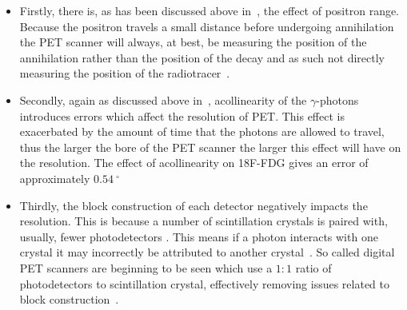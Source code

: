                 \begin{itemize}
                    \item Firstly, there is, as has been discussed above in~, the effect of positron range. Because the positron travels a small distance before undergoing annihilation the \gls{PET} scanner will always, at best, be measuring the position of the annihilation rather than the position of the decay and as such not directly measuring the position of the radiotracer~\parencite{PositronRangeLevinHoffmanBib}.

                    \item Secondly, again as discussed above in~, acollinearity of the $\gamma$-photons introduces errors which affect the resolution of \gls{PET}. %
                    This effect is exacerbated by the amount of time that the photons are allowed to travel, thus the larger the bore of the \gls{PET} scanner the larger this effect will have on the resolution. The effect of acollinearity on \gls{18F-FDG} gives an error of approximately $\SI{0.54}{^{\circ}}$~\parencite{AccollinearityBib}
                    
                    
                    \item Thirdly, the block construction of each detector negatively impacts the resolution. This is because a number of scintillation crystals is paired with, usually, fewer photodetectors%
                    . This means if a photon interacts with one crystal it may incorrectly be attributed to another crystal~\parencite{Nieman2015}. So called digital \gls{PET} scanners are beginning to be seen which use a $1:1$ ratio of photodetectors to scintillation crystal, effectively removing issues related to block construction~\parencite{Schillaci2019DigitalImaging}.
                    

\end{itemize}
